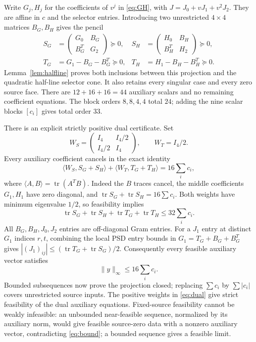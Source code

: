 \documentclass[11pt]{article}
\begin{document}
Write $G_j,H_j$ for the coefficients of $v^j$ in \eqref{eq:GH}, with
$J=J_0+vJ_1+v^2J_2$. They are affine in $c$ and the selector entries.
Introducing two unrestricted $4\times4$ matrices $B_G,B_H$ gives the pencil
\begin{equation}
\boxed{\begin{aligned}
 S_G&=\begin{pmatrix}G_0&B_G\\B_G^T&G_2\end{pmatrix}\succeq0,&
 S_H&=\begin{pmatrix}H_0&B_H\\B_H^T&H_2\end{pmatrix}\succeq0,\\
 T_G&=G_1-B_G-B_G^T\succeq0,&
 T_H&=H_1-B_H-B_H^T\succeq0.
\end{aligned}}                                             \label{eq:pencil}
\end{equation}
Lemma~\ref{lem:halfline} proves both inclusions between this projection
and the quadratic half-line selector cone. It also retains every singular
case and every zero source face. There are $12+16+16=44$ auxiliary scalars
and no remaining coefficient equations. The block orders $8,8,4,4$ total
$24$; adding the nine scalar blocks $[c_i]$ gives total order $33$.

There is an explicit strictly positive dual certificate. Set
\[
 W_S=\begin{pmatrix}I_4&I_4/2\\I_4/2&I_4\end{pmatrix},\qquad W_T=I_4/2.
\]
Every auxiliary coefficient cancels in the exact identity
\begin{equation}
 \langle W_S,S_G+S_H\rangle+\langle W_T,T_G+T_H\rangle
      =16\sum_i c_i,                                      \label{eq:dual}
\end{equation}
where $\langle A,B\rangle=\operatorname{tr}(A^TB)$.
Indeed the $B$ traces cancel, the middle coefficients $G_1,H_1$ have zero
diagonal, and $\operatorname{tr}S_G+\operatorname{tr}S_H=16\sum c_i$.
Both weights have minimum eigenvalue $1/2$, so feasibility implies
\[
 \operatorname{tr}S_G+\operatorname{tr}S_H+
 \operatorname{tr}T_G+\operatorname{tr}T_H\le32\sum_i c_i.
\]
All $B_G,B_H,J_0,J_2$ entries are off-diagonal Gram entries.
For a $J_1$ entry at distinct $G_1$ indices $r,t$, combining the local
PSD entry bounds in $G_1=T_G+B_G+B_G^T$ gives
$|(J_1)_{ij}|\le(\operatorname{tr}T_G+\operatorname{tr}S_G)/2$.
Consequently every feasible auxiliary vector satisfies
\begin{equation}
 \|y\|_\infty\le16\sum_i c_i.                               \label{eq:bound}
\end{equation}
Bounded subsequences now prove the projection closed; replacing
$\sum c_i$ by $\sum|c_i|$ covers unrestricted source inputs.
The positive weights in \eqref{eq:dual} give strict feasibility of the
dual auxiliary equations. Fixed-source feasibility cannot be weakly
infeasible: an unbounded near-feasible sequence, normalized by its auxiliary
norm, would give feasible source-zero data with a nonzero auxiliary vector,
contradicting \eqref{eq:bound}; a bounded sequence gives a feasible limit.
\end{document}
